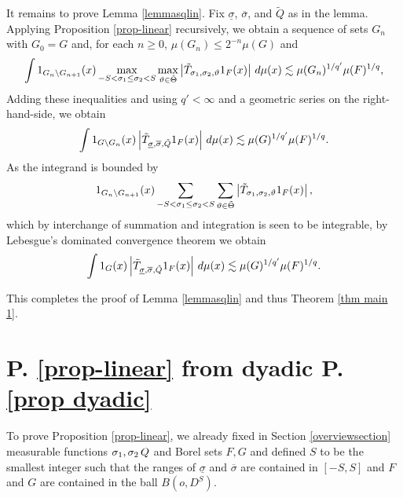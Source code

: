 It remains to prove Lemma \ref{lemmasqlin}.
Fix $\underline{\sigma}$, $\overline{\sigma}$,
and $\tilde{Q}$ as in  the lemma.
Applying Proposition \ref{prop-linear} recursively, we obtain
a sequence of sets $G_n$ with $G_0=G$ and,
for each $n\ge 0$, $\mu(G_{n})\le 2^{-n} \mu(G)$
    and
    \begin{equation}
    \int 1_{G_{n}\setminus G_{n+1}}(x)
\max_{-S<\sigma_1\le \sigma_2<S}\max_{\vartheta\in\tilde{\Theta}}
\left| \Tilde{T}_{\sigma_1,\sigma_2,\vartheta} 1_{F}(x) \right|\, d\mu(x)
\lesssim \mu(G_n)^{1/q'} \mu(F)^{1/q},
\end{equation}
Adding these inequalities and using $q'<\infty$ and
a geometric series on the right-hand-side, we obtain
    \begin{equation} \label{Sqcut2}
    \int 1_{G\setminus G_{n}}(x)
\left| \Tilde{T}_{\underline{\sigma},\overline{\sigma},\tilde{Q}}1_F(x) \right|\, d\mu(x)
\lesssim \mu(G)^{1/q'} \mu(F)^{1/q}.
\end{equation}
As the integrand is bounded by
\begin{equation}1_{G_{n}\setminus G_{n+1}}(x)
\sum_{-S<\sigma_1\le \sigma_2<S}\sum_{\vartheta\in\tilde{\Theta}}
\left| \Tilde{T}_{\sigma_1,\sigma_2,\vartheta} 1_{F}(x) \right|,
\end{equation}
which by interchange of summation and integration is seen to be integrable, by Lebesgue's dominated convergence theorem we obtain
    \begin{equation} \label{Sqcut3}
    \int 1_{G}(x)
\left| \Tilde{T}_{\underline{\sigma},\overline{\sigma},\tilde{Q}}1_F(x) \right|\, d\mu(x)
\lesssim \mu(G)^{1/q'} \mu(F)^{1/q}.
\end{equation}



This completes the proof of Lemma \ref{lemmasqlin}
and thus Theorem \ref{thm main 1}.

\chapter{P. \ref{prop-linear}
from dyadic P. \ref{prop dyadic}}
\label{christsection}

To prove Proposition
\ref{prop-linear}, we already fixed in Section \ref{overviewsection}
measurable functions ${\sigma_1},\sigma_2\,{Q}$ and Borel sets $F,G$
and defined $S$ to be the smallest
integer such that the ranges of
$\underline{\sigma}$ and $ \overline\sigma$ are contained in $[-S,S]$ and $F$ and $G$ are contained
in the ball $B(o, D^S)$.

